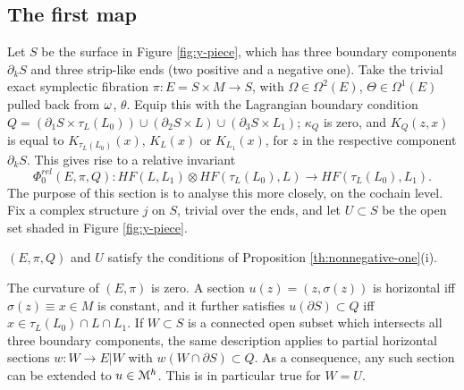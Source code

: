 \documentclass[10pt,letterpaper]{article}
\begin{document}
\subsection{The first map\label{sec:b}}

Let $S$ be the surface in Figure \ref{fig:y-piece}, which has three boundary
components $\partial_kS$ and three strip-like ends (two positive and a negative
one). Take the trivial exact symplectic fibration $\pi : E = S \times M
\rightarrow S$, with $\Omega \in \Omega^2(E)$, $\Theta \in \Omega^1(E)$ pulled
back from $\omega$, $\theta$. Equip this with the Lagrangian boundary condition $Q
= (\partial_1 S \times \tau_L(L_0)) \cup (\partial_2 S \times L) \cup
(\partial_3 S \times L_1)$; $\kappa_{Q}$ is zero, and $K_{Q}(z,x)$ is equal to
$K_{\tau_L(L_0)}(x)$, $K_L(x)$ or $K_{L_1}(x)$, for $z$ in the respective
component $\partial_kS$. This gives rise to a relative invariant
\[
 \Phi^{rel}_0(E,\pi,Q) : HF(L,L_1) \otimes HF(\tau_L(L_0),L) \rightarrow
 HF(\tau_L(L_0),L_1).
\]
The purpose of this section is to analyse this more closely, on the cochain
level. Fix a complex structure $j$ on $S$, trivial over the ends, and let $U
\subset S$ be the open set shaded in Figure \ref{fig:y-piece}.


\begin{lemma} \label{th:transversality-b}
$(E,\pi,Q)$ and $U$ satisfy the conditions of Proposition
\ref{th:nonnegative-one}(i).
\end{lemma}

\proof The curvature of $(E,\pi)$ is zero. A section $u(z) = (z,\sigma(z))$ is
horizontal iff $\sigma(z) \equiv x \in M$ is constant, and it further satisfies
$u(\partial S) \subset Q$ iff $x \in \tau_L(L_0) \cap L \cap L_1$. If $W
\subset S$ is a connected open subset which intersects all three boundary
components, the same description applies to partial horizontal sections $w: W
\rightarrow E|W$ with $w(W \cap \partial S) \subset Q$. As a consequence, any
such section can be extended to $u \in \mathcal{M}^h$. This is in particular true for
$W = U$.
\end{document}
